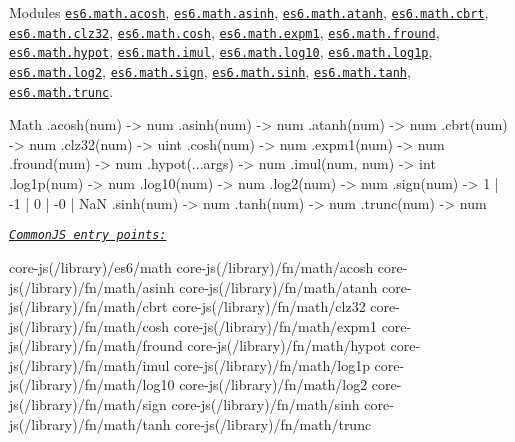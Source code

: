 Modules \href{https://github.com/zloirock/core-js/blob/v2.6.0/modules/es6.math.acosh.js}{\tt {\ttfamily es6.\+math.\+acosh}}, \href{https://github.com/zloirock/core-js/blob/v2.6.0/modules/es6.math.asinh.js}{\tt {\ttfamily es6.\+math.\+asinh}}, \href{https://github.com/zloirock/core-js/blob/v2.6.0/modules/es6.math.atanh.js}{\tt {\ttfamily es6.\+math.\+atanh}}, \href{https://github.com/zloirock/core-js/blob/v2.6.0/modules/es6.math.cbrt.js}{\tt {\ttfamily es6.\+math.\+cbrt}}, \href{https://github.com/zloirock/core-js/blob/v2.6.0/modules/es6.math.clz32.js}{\tt {\ttfamily es6.\+math.\+clz32}}, \href{https://github.com/zloirock/core-js/blob/v2.6.0/modules/es6.math.cosh.js}{\tt {\ttfamily es6.\+math.\+cosh}}, \href{https://github.com/zloirock/core-js/blob/v2.6.0/modules/es6.math.expm1.js}{\tt {\ttfamily es6.\+math.\+expm1}}, \href{https://github.com/zloirock/core-js/blob/v2.6.0/modules/es6.math.fround.js}{\tt {\ttfamily es6.\+math.\+fround}}, \href{https://github.com/zloirock/core-js/blob/v2.6.0/modules/es6.math.hypot.js}{\tt {\ttfamily es6.\+math.\+hypot}}, \href{https://github.com/zloirock/core-js/blob/v2.6.0/modules/es6.math.imul.js}{\tt {\ttfamily es6.\+math.\+imul}}, \href{https://github.com/zloirock/core-js/blob/v2.6.0/modules/es6.math.log10.js}{\tt {\ttfamily es6.\+math.\+log10}}, \href{https://github.com/zloirock/core-js/blob/v2.6.0/modules/es6.math.log1p.js}{\tt {\ttfamily es6.\+math.\+log1p}}, \href{https://github.com/zloirock/core-js/blob/v2.6.0/modules/es6.math.log2.js}{\tt {\ttfamily es6.\+math.\+log2}}, \href{https://github.com/zloirock/core-js/blob/v2.6.0/modules/es6.math.sign.js}{\tt {\ttfamily es6.\+math.\+sign}}, \href{https://github.com/zloirock/core-js/blob/v2.6.0/modules/es6.math.sinh.js}{\tt {\ttfamily es6.\+math.\+sinh}}, \href{https://github.com/zloirock/core-js/blob/v2.6.0/modules/es6.math.tanh.js}{\tt {\ttfamily es6.\+math.\+tanh}}, \href{https://github.com/zloirock/core-js/blob/v2.6.0/modules/es6.math.trunc.js}{\tt {\ttfamily es6.\+math.\+trunc}}. 
\begin{DoxyCode}
Math
  .acosh(num)     -> num
  .asinh(num)     -> num
  .atanh(num)     -> num
  .cbrt(num)      -> num
  .clz32(num)     -> uint
  .cosh(num)      -> num
  .expm1(num)     -> num
  .fround(num)    -> num
  .hypot(...args) -> num
  .imul(num, num) -> int
  .log1p(num)     -> num
  .log10(num)     -> num
  .log2(num)      -> num
  .sign(num)      -> 1 | -1 | 0 | -0 | NaN
  .sinh(num)      -> num
  .tanh(num)      -> num
  .trunc(num)     -> num
\end{DoxyCode}
 \href{#commonjs}{\tt {\itshape Common\+JS entry points\+:}} 
\begin{DoxyCode}
core-js(/library)/es6/math
core-js(/library)/fn/math/acosh
core-js(/library)/fn/math/asinh
core-js(/library)/fn/math/atanh
core-js(/library)/fn/math/cbrt
core-js(/library)/fn/math/clz32
core-js(/library)/fn/math/cosh
core-js(/library)/fn/math/expm1
core-js(/library)/fn/math/fround
core-js(/library)/fn/math/hypot
core-js(/library)/fn/math/imul
core-js(/library)/fn/math/log1p
core-js(/library)/fn/math/log10
core-js(/library)/fn/math/log2
core-js(/library)/fn/math/sign
core-js(/library)/fn/math/sinh
core-js(/library)/fn/math/tanh
core-js(/library)/fn/math/trunc
\end{DoxyCode}
